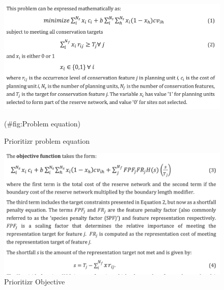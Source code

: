 \documentclass[
  12pt,
]{book}
\begin{document}
\begin{figure}

{\centering \includegraphics[width=1\linewidth]{images/Equation} 

}

\caption{Prioritizr problem equation}(\#fig:Problem equation)
\end{figure}

\begin{figure}

{\centering \includegraphics[width=1\linewidth]{images/Objective} 

}

\caption{Prioritizr Objective}\label{fig:Objective}
\end{figure}
\end{document}
